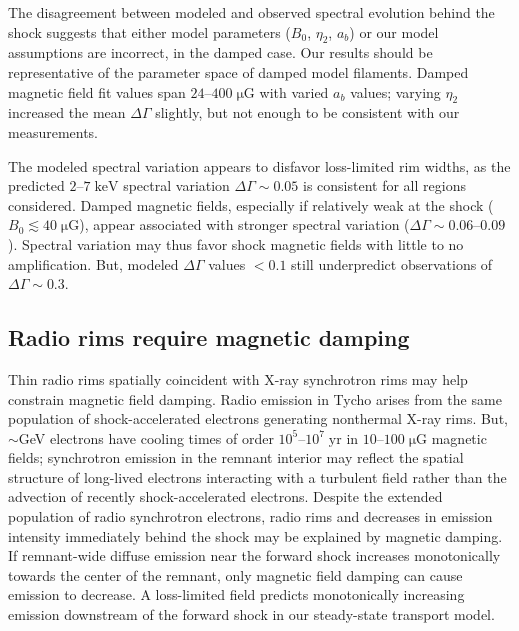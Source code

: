 \documentclass[manuscript]{aastex}  %
\newcommand*{\mt}{\mathrm}
\newcommand*{\unit}[1]{\;\mt{#1}}  %
\newcommand*{\abt}{\mathord{\sim}} %
\newcommand*{\muG}{\unit{\mu G}}
\begin{document}
The disagreement between modeled and observed spectral evolution behind the
shock suggests that either model parameters ($B_0$, $\eta_2$, $a_b$) or our
model assumptions are incorrect, in the damped case.  Our results should be
representative of the parameter space of damped model filaments.  Damped
magnetic field fit values span $24$--$400 \muG$ with varied $a_b$ values;
varying $\eta_2$ increased the mean $\Delta\Gamma$ slightly, but not enough to
be consistent with our measurements.

The modeled spectral variation appears to disfavor loss-limited rim widths, as
the predicted $2$--$7 \unit{keV}$ spectral variation $\Delta\Gamma \sim 0.05$
is consistent for all regions considered.  Damped magnetic fields, especially
if relatively weak at the shock ($B_0 \lesssim 40 \muG$), appear associated
with stronger spectral variation ($\Delta\Gamma \sim 0.06$--$0.09$).  Spectral
variation may thus favor shock magnetic fields with little to no amplification.
But, modeled $\Delta\Gamma$ values $< 0.1$ still underpredict observations of
$\Delta\Gamma \sim 0.3$.

\subsection{Radio rims require magnetic damping}

Thin radio rims spatially coincident with X-ray synchrotron rims may help
constrain magnetic field damping.  Radio emission in Tycho arises from the same
population of shock-accelerated electrons generating nonthermal X-ray rims.
But, $\abt$GeV electrons have cooling times of order $10^5$--$10^7 \unit{yr}$
in $10$--$100 \muG$ magnetic fields; synchrotron emission in the remnant
interior may reflect the spatial structure of long-lived electrons interacting
with a turbulent field rather than the advection of recently shock-accelerated
electrons.
Despite the extended population of radio synchrotron electrons, radio rims and
decreases in emission intensity immediately behind the shock may be explained
by magnetic damping.  If remnant-wide diffuse emission near the forward shock
increases monotonically towards the center of the remnant, only magnetic field
damping can cause emission to decrease.  A loss-limited field predicts
monotonically increasing emission downstream of the forward shock in our
steady-state transport model.
\end{document}
